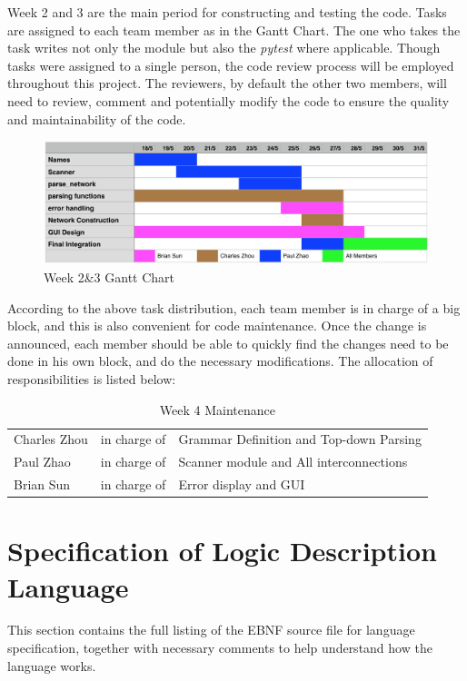 \documentclass[12pt]{article}
\def\n{\noindent}
\begin{document}
\n Week 2 and 3 are the main period for constructing and testing the code. Tasks are assigned to each team member as in the Gantt Chart. The one who takes the task writes not only the module but also the \textit{pytest} where applicable. Though tasks were assigned to a single person, the code review process will be employed throughout this project. The reviewers, by default the other two members, will need to review, comment and potentially modify the code to ensure the quality and maintainability of the code. \par
\begin{figure}[H]
    \centering
    \includegraphics[scale=0.6]{week23_gantt}
    \caption{Week 2\&3 Gantt Chart}
\end{figure}

\n According to the above task distribution, each team member is in charge of a big block, and this is also convenient for code maintenance. Once the change is announced, each member should be able to quickly find the changes need to be done in his own block, and do the necessary modifications. The allocation of responsibilities is listed below:

\begin{table}[H]
\begin{tabular}{p{3cm}p{4cm}p{8cm}}
Charles Zhou & in charge of & Grammar Definition and Top-down Parsing\\
Paul Zhao & in charge of & Scanner module and All interconnections\\
Brian Sun & in charge of & Error display and GUI\\
\end{tabular}
\caption{Week 4 Maintenance}
\end{table}

\section{Specification of Logic Description Language}

This section contains the full listing of the EBNF source file for language
specification, together with necessary comments to help understand how the
language works.
\end{document}
